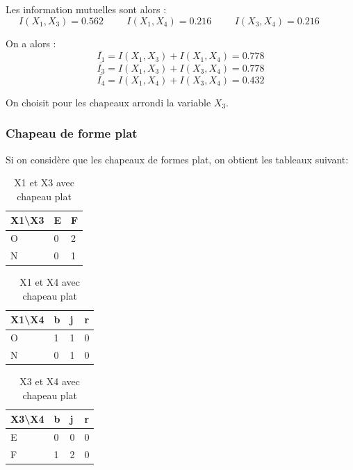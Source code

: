\documentclass{article}
\begin{document}
Les information mutuelles sont alors :
\[
  I(X_1,X_3)=0.562 \hspace{1cm} I(X_1,X_4)=0.216 \hspace{1cm} I(X_3,X_4)=0.216 \hspace{1cm}
\]

On a alors :
\[
\bar{I_1}=I(X_1,X_3) + I(X_1,X_4)= 0.778 
\]
\[
\bar{I_3}=I(X_1,X_3) + I(X_3,X_4)= 0.778
\]
\[
\bar{I_4}=I(X_1,X_4) + I(X_3,X_4)= 0.432
\]

On choisit pour les chapeaux arrondi la variable $X_3$.
    


\subsubsection{Chapeau de forme plat}
Si on considère que les chapeaux de formes plat, on obtient les tableaux suivant: 

\begin{table}[H]
  \centering
  \caption{X1 et X3 avec chapeau plat}
  \begin{tabular}{|l|l|l|}
  \hline
  X1\textbackslash{}X3 & E & F \\ \hline
  O                    & 0 & 2 \\ \hline
  N                    & 0 & 1 \\ \hline
  \end{tabular}
\end{table}

\begin{table}[h]
  \centering
  \caption{X1 et X4 avec chapeau plat}
  \begin{tabular}{|l|l|l|l|}
  \hline
  X1\textbackslash{}X4 & b & j & r \\ \hline
  O                    & 1 & 1 & 0 \\ \hline
  N                    & 0 & 1 & 0 \\ \hline
  \end{tabular}
\end{table}

\begin{table}[h]
  \centering
  \caption{X3 et X4 avec chapeau plat}
  \begin{tabular}{|l|l|l|l|}
  \hline
  X3\textbackslash{}X4 & b & j & r \\ \hline
  E                    & 0 & 0 & 0 \\ \hline
  F                    & 1 & 2 & 0 \\ \hline
  \end{tabular}
\end{table}
\end{document}
